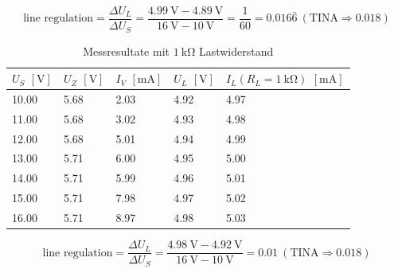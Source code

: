\documentclass[../main.tex]{subfiles}
\begin{document}
\begin{equation}
    \text{line regulation} = \frac{\Delta U_{L}}{\Delta U_{S}} = \frac{\SI{4.99}{\volt}-\SI{4.89}{\volt}}{\SI{16}{\volt} - \SI{10}{\volt}} = \frac{1}{60} = 0.016\bar{6}\ (\text{TINA} \Rightarrow 0.018)
    \label{equ:task2_line_reg_680R}
\end{equation}

\begin{table}[h]
\renewcommand{\arraystretch}{1.3}
\centering
\begin{tabular}{l|llll}
\textbf{$U_S$} $[\si{\volt}]$ & \textbf{$U_Z$} $[\si{\volt}]$ & \textbf{$I_V$} $[\si{\milli\ampere}]$ & \textbf{$U_L$} $[\si{\volt}]$ & \textbf{$I_L (R_L = \SI{1}{\kilo\ohm})$} $[\si{\milli\ampere}]$\\  \hline
10.00       & 5.68        & 2.03        & 4.92        & 4.97 \\
11.00       & 5.68        & 3.02        & 4.93        & 4.98 \\
12.00       & 5.68        & 5.01        & 4.94        & 4.99 \\
13.00       & 5.71        & 6.00        & 4.95        & 5.00 \\
14.00       & 5.71        & 5.99        & 4.96        & 5.01 \\
15.00       & 5.71        & 7.98        & 4.97        & 5.02 \\
16.00       & 5.71        & 8.97        & 4.98        & 5.03 
\end{tabular}
\caption{Messresultate mit $\SI{1}{\kilo\ohm}$ Lastwiderstand}
\label{tab:result_task2_R1k}
\end{table}

\begin{equation}
    \text{line regulation} = \frac{\Delta U_{L}}{\Delta U_{S}} = \frac{\SI{4.98}{\volt}-\SI{4.92}{\volt}}{\SI{16}{\volt} - \SI{10}{\volt}} = 0.01 \ (\text{TINA} \Rightarrow 0.018)
    \label{equ:task2_line_reg_1k}
\end{equation}

\newpage
\end{document}
